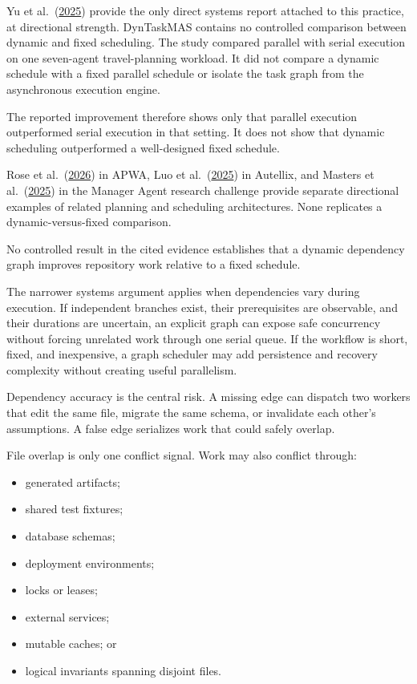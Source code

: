 Yu et al.~(\href{https://arxiv.org/abs/2503.07675}{2025}) provide the only direct systems report attached to this practice, at directional strength. DynTaskMAS contains no controlled comparison between dynamic and fixed scheduling. The study compared parallel with serial execution on one seven-agent travel-planning workload. It did not compare a dynamic schedule with a fixed parallel schedule or isolate the task graph from the asynchronous execution engine.

The reported improvement therefore shows only that parallel execution outperformed serial execution in that setting. It does not show that dynamic scheduling outperformed a well-designed fixed schedule.

Rose et al.~(\href{https://arxiv.org/abs/2605.15132}{2026}) in APWA, Luo et al.~(\href{https://arxiv.org/abs/2502.13965}{2025}) in Autellix, and Masters et al.~(\href{https://arxiv.org/abs/2510.02557}{2025}) in the Manager Agent research challenge provide separate directional examples of related planning and scheduling architectures. None replicates a dynamic-versus-fixed comparison.

No controlled result in the cited evidence establishes that a dynamic dependency graph improves repository work relative to a fixed schedule.

The narrower systems argument applies when dependencies vary during execution. If independent branches exist, their prerequisites are observable, and their durations are uncertain, an explicit graph can expose safe concurrency without forcing unrelated work through one serial queue. If the workflow is short, fixed, and inexpensive, a graph scheduler may add persistence and recovery complexity without creating useful parallelism.

Dependency accuracy is the central risk. A missing edge can dispatch two workers that edit the same file, migrate the same schema, or invalidate each other's assumptions. A false edge serializes work that could safely overlap.


File overlap is only one conflict signal. Work may also conflict through:

\begin{itemize}
\tightlist
\item
  generated artifacts;
\item
  shared test fixtures;
\item
  database schemas;
\item
  deployment environments;
\item
  locks or leases;
\item
  external services;
\item
  mutable caches; or
\item
  logical invariants spanning disjoint files.
\end{itemize}


